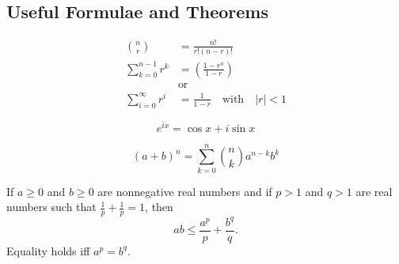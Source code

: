 \subsection*{Useful Formulae and Theorems}
\begin{align*}
    \tag{Combination} \binom{n}{r} & = \frac{n!}{r! (n-r)!}                                         \\
    \tag{Geometric Series}
    \sum_{k = 0}^{n - 1} r^k            & = \left( \frac{1 - r^n}{1 - r} \right)                         \\
                                        & \text{or}                                                      \\
    \sum_{i = 0}^{\infty} r^{i}         & = \frac{1}{1 - r} \quad \text{with} \quad \left| r \right| < 1
    \label{eqn:geometric-series}
\end{align*}

\begin{equation*} \tag{Euler's formula}
    e^{i x}=\cos x+i \sin x
    \label{eqn:Euler}
\end{equation*}

\begin{equation*}
    \tag{Newton's Binomial formula}
    (a+b)^{n}=\sum_{k=0}^{n} \binom{n}{k} a^{n-k} b^{k}
    \label{eqn:nbf}
\end{equation*}

\begin{thm} \label{theorem: youngs}
    If $a \geq 0$ and $b \geq 0$ are nonnegative real numbers and if $p > 1$ and $q > 1$ are real numbers such that $\frac{1}{p} + \frac{1}{p} = 1$, then
    \[
        ab \leq \frac{a^p}{p} + \frac{b^q}{q}.
    \]
    Equality holds iff $a^p = b^q$.
\end{thm}